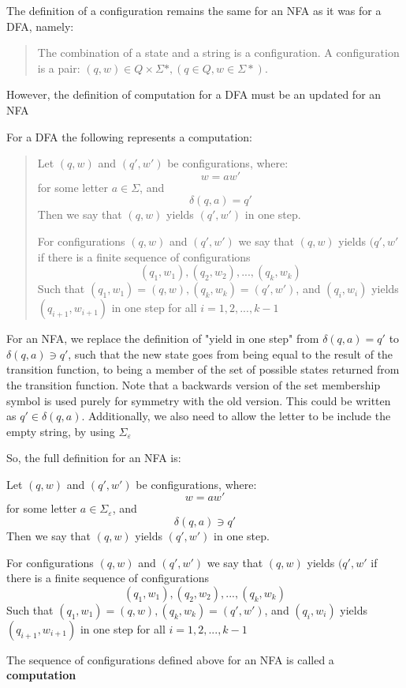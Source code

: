 \documentclass[11pt]{article}
\begin{document}
The definition of a configuration remains the same for an NFA as it was for a
DFA, namely:
\begin{quote}
The combination of a state and a string is a configuration.
A configuration is a pair: $(q, w) \in Q \times \Sigma\ast, (q \in Q, w \in
	\Sigma\ast)$.
\end{quote}

However, the definition of computation for a DFA must be an updated for an NFA

For a DFA the following represents a computation:
\begin{quote}
Let $(q, w)$ and $(q', w')$ be configurations, where:
$$w = aw'$$
for some letter $a \in \Sigma$, and
$$\delta(q, a) = q'$$
Then we say that $(q, w)$ yields $(q', w')$ in one step.

For configurations $(q, w)$ and $(q', w')$ we say that $(q, w)$ yields $(q', w'$
if there is a finite sequence of configurations
$$(q_1, w_1), (q_2, w_2), ..., (q_k, w_k)$$
Such that $(q_1, w_1)=(q,w), (q_k, w_k)=(q',w')$, and
$(q_i, w_i)$ yields $(q_{i+1}, w_{i+1})$ in one step for all $i=1, 2, ..., k-1$
\end{quote}

For an NFA, we replace the definition of "yield in one step" from
$\delta(q,a)=q'$ to $\delta(q,a) \ni q'$, such that the new state goes from
being equal to the result of the transition function, to being a member of the
set of possible states returned from the transition function. Note that a
backwards version of the set membership symbol is used purely for symmetry with
the old version. This could be written as $q' \in \delta(q,a)$. Additionally, we
also need to allow the letter to be include the empty string, by using
$\Sigma_\varepsilon$

So, the full definition for an NFA is:

Let $(q, w)$ and $(q', w')$ be configurations, where:
$$w = aw'$$
for some letter $a \in \Sigma_\varepsilon$, and
$$\delta(q, a) \ni q'$$
Then we say that $(q, w)$ yields $(q', w')$ in one step.

For configurations $(q, w)$ and $(q', w')$ we say that $(q, w)$ yields $(q', w'$
if there is a finite sequence of configurations
$$(q_1, w_1), (q_2, w_2), ..., (q_k, w_k)$$
Such that $(q_1, w_1)=(q,w), (q_k, w_k)=(q',w')$, and
$(q_i, w_i)$ yields $(q_{i+1}, w_{i+1})$ in one step for all $i=1, 2, ..., k-1$

The sequence of configurations defined above for an NFA is called a \textbf{computation}
 
\end{document}
